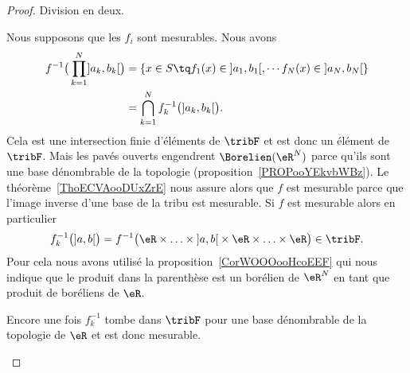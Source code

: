 \begin{proof}
	Division en deux.
	\begin{subproof}
		Nous supposons que les \( f_i\) sont mesurables. Nous avons
		\begin{subequations}
			\begin{align}
				f^{-1}\big( \prod_{k=1}^N\mathopen] a_k , b_k \mathclose[ \big) & =\{ x\in S\tq f_1(x)\in\mathopen] a_1 , b_1 \mathclose[ ,\cdots f_N(x)\in\mathopen] a_N , b_N \mathclose[\} \\
				                                                                & =\bigcap_{k=1}^Nf_k^{-1}\big( \mathopen] a_k , b_k \mathclose[ \big).
			\end{align}
		\end{subequations}
		Cela est une intersection finie d'éléments de \( \tribF\) et est donc un élément de \( \tribF\). Mais les pavés ouverts engendrent \( \Borelien(\eR^N)\) parce qu'ils sont une base dénombrable de la topologie (proposition~\ref{PROPooYEkvbWBz}). Le théorème~\ref{ThoECVAooDUxZrE} nous assure alors que \( f\) est mesurable parce que l'image inverse d'une base de la tribu est mesurable.
		Si \( f\) est mesurable alors en particulier
		\begin{equation}
			f_k^{-1}\big( \mathopen] a , b \mathclose[ \big)=f^{-1}\big( \eR\times\ldots\times \mathopen] a , b \mathclose[\times \eR\times\ldots\times \eR \big)\in\tribF.
		\end{equation}
		Pour cela nous avons utilisé la proposition~\ref{CorWOOOooHcoEEF} qui nous indique que le produit dans la parenthèse est un borélien de \( \eR^N\) en tant que produit de boréliens de \( \eR\).

		Encore une fois \( f_k^{-1}\) tombe dans \( \tribF\) pour une base dénombrable de la topologie de \( \eR\) et est donc mesurable.
	\end{subproof}
\end{proof}
